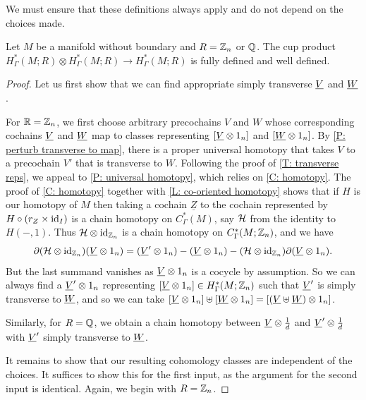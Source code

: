 We must ensure that these definitions always apply and do not depend on the choices made.

\begin{theorem}
	Let $M$ be a manifold without boundary and $R = \mathbb{Z}_n$ or $\mathbb{Q}$.
	The cup product $H^*_{\Gamma}(M;R) \otimes H^*_{\Gamma}(M;R) \to H^*_{\Gamma}(M;R)$ is fully defined and well defined.
\end{theorem}

\begin{proof}
	Let us first show that we can find appropriate simply transverse $\underline{V}$ and $\underline{W}$.

	For $\mathbb{R} = \mathbb{Z}_n$, we first choose arbitrary precochains $V$ and $W$ whose corresponding cochains $\underline{V}$ and $\underline{W}$ map to classes representing $[\underline{V} \otimes 1_n]$ and $[\underline{W} \otimes 1_n]$.
	By \cref{P: perturb transverse to map}, there is a proper universal homotopy that takes $V$ to a precochain $V'$ that is transverse to $W$.
	Following the proof of \cref{T: transverse reps}, we appeal to \cref{P: universal homotopy}, which relies on \cref{C: homotopy}.
	The proof of \cref{C: homotopy} together with \cref{L: co-oriented homotopy} shows that if $H$ is our homotopy of $M$ then taking a cochain $\underline{Z}$ to the cochain represented by $H\circ (r_Z \times \mathrm{id}_I)$ is a chain homotopy on $C^*_\Gamma(M)$, say $\mathcal{H}$ from the identity to $H(-,1)$.
	Thus $\mathcal{H} \otimes \mathrm{id}_{\mathbb{Z}_n}$ is a chain homotopy on $C^*_\Gamma(M;\mathbb{Z}_n)$,
	and we have $$\partial (\mathcal{H} \otimes \mathrm{id}_{\mathbb{Z}_n})(\underline{V} \otimes 1_n) = (\underline{V}'\otimes 1_n) - (\underline{V}\otimes 1_n) -
	(\mathcal{H} \otimes \mathrm{id}_{\mathbb{Z}_n})\partial (\underline{V} \otimes 1_n).$$
	But the last summand vanishes as $\underline{V} \otimes 1_n$ is a cocycle by assumption.
	So we can always find a $\underline{V}' \otimes 1_n$ representing $[\underline{V} \otimes 1_n] \in H^*_\Gamma(M;\mathbb{Z}_n)$ such that $\underline{V}'$ is simply transverse to $\underline{W}$, and so we can take $[\underline{V} \otimes 1_n] \uplus [\underline{W} \otimes 1_n] = [(\underline{V} \uplus \underline{W})\otimes 1_n]$.

	Similarly, for $R= \mathbb{Q}$, we obtain a chain homotopy between $\underline{V} \otimes \frac{1}{d}$ and $\underline{V}' \otimes \frac{1}{d}$ with $\underline{V}'$ simply transverse to $\underline{W}$.

	It remains to show that our resulting cohomology classes are independent of the choices. It suffices to show this for the first input, as the argument for the second input is identical. Again, we begin with $R = \mathbb{Z}_n$.


\end{proof}
